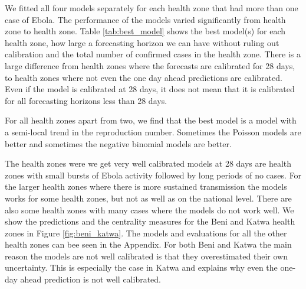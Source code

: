 \documentclass[12pt]{article}
\begin{document}
We fitted all four models separately for each health zone that had more than one case of Ebola. The performance of the models varied significantly from health zone to health zone. Table \ref{tab:best_model} shows the best model(s) for each health zone, how large a forecasting horizon we can have without ruling out calibration and the total number of confirmed cases in the health zone. There is a large difference from health zones where the forecasts are calibrated for 28 days, to health zones where not even the one day ahead predictions are calibrated. Even if the model is calibrated at 28 days, it does not mean that it is calibrated for all forecasting horizons less than 28 days. 




For all health zones apart from two, we find that the best model is a model with a semi-local trend in the reproduction number. Sometimes the Poisson models are better and sometimes the negative binomial models are better.

The health zones were we get very well calibrated models at 28 days are health zones with small bursts of Ebola activity followed by long periods of no cases. For the larger health zones where there is more sustained transmission the models works for some health zones, but not as well as on the national level. There are also some health zones with many cases where the models do not work well. We show the predictions and the centrality measures for the Beni and Katwa health zones in Figure \ref{fig:beni_katwa}. The models and evaluations for all the other health zones can bee seen in the Appendix. For both Beni and Katwa the main reason the models are not well calibrated is that they overestimated their own uncertainty. This is especially the case in Katwa and explains why even the one-day ahead prediction is not well calibrated. 
\end{document}
